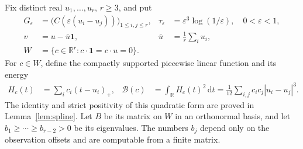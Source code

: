 \documentclass[11pt]{article}
\theoremstyle{definition}\newtheorem{definition}[theorem]{Definition}
\theoremstyle{remark}\newtheorem{remark}[theorem]{Remark}
\newcommand{\R}{\mathbb R}
\newcommand{\dd}{\,\mathrm d}
\newcommand{\eps}{\varepsilon}
\newcommand{\one}{\mathbf1}
\newcommand{\tauE}{\tau_\eps}
\newcommand{\bB}{\mathcal B}
\begin{document}
Fix distinct real $u_1,\ldots,u_r$, $r\ge3$, and put
\begin{align}
 G_\eps&=\bigl(C(\eps(u_i-u_j))\bigr)_{1\le i,j\le r},&
 \tauE&=\eps^3\log(1/\eps),\quad 0<\eps<1,\label{eq:G}\\
 v&=u-\bar u\one,& \bar u&=\frac1r\sum_i u_i,\\
 W&=\{c\in\R^r:c\cdot\one=c\cdot u=0\}.\label{eq:W}
\end{align}
For $c\in W$, define the compactly supported piecewise linear function
and its energy
\begin{align}
 H_c(t)&=\sum_i c_i(t-u_i)_+,&
 \bB(c)&=\int_\R H_c(t)^2\dd t
       =\frac1{12}\sum_{i,j}c_i c_j|u_i-u_j|^3.\label{eq:B}
\end{align}
The identity and strict positivity of this quadratic form are proved in
Lemma~\ref{lem:spline}. Let $B$ be its matrix on $W$ in an orthonormal
basis, and let $b_1\ge\cdots\ge b_{r-2}>0$ be its eigenvalues.
The numbers $b_j$ depend only on the observation offsets and are
computable from a finite matrix.
\end{document}

